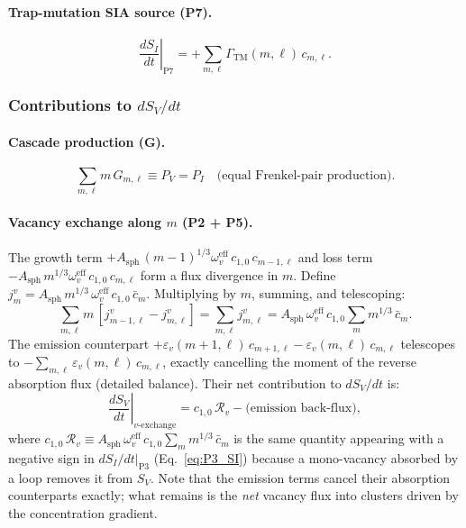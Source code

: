 \documentclass[pdflatex,sn-basic]{sn-jnl} %
\begin{document}
\paragraph{Trap-mutation SIA source (P7).}
\begin{equation}\label{eq:P7_SI}
    \left.\frac{dS_I}{dt}\right|_{\mathrm{P7}}
    = +\sum_{m,\ell}\Gamma_{\mathrm{TM}}(m,\ell)\,c_{m,\ell}.
\end{equation}

\subsubsection*{Contributions to $dS_V/dt$}

\paragraph{Cascade production (G).}
\begin{equation}
    \sum_{m,\ell} m\,G_{m,\ell} \equiv P_V = P_I
    \quad \text{(equal Frenkel-pair production)}.
\end{equation}

\paragraph{Vacancy exchange along $m$ (P2 + P5).}
The growth term $+A_{\mathrm{sph}}\,(m{-}1)^{1/3}\omega_v^{\mathrm{eff}}\,
c_{1,0}\,c_{m-1,\ell}$ and loss term $-A_{\mathrm{sph}}\,m^{1/3}
\omega_v^{\mathrm{eff}}\,c_{1,0}\,c_{m,\ell}$ form a flux divergence in $m$.
Define $j_m^v = A_{\mathrm{sph}}\,m^{1/3}\,\omega_v^{\mathrm{eff}}\,c_{1,0}
\,\bar{c}_m$. Multiplying by $m$, summing, and telescoping:
\begin{equation}\label{eq:P2v_SV}
    \sum_{m,\ell} m\,[j_{m-1,\ell}^v - j_{m,\ell}^v]
    = \sum_{m,\ell} j_{m,\ell}^v
    = A_{\mathrm{sph}}\,\omega_v^{\mathrm{eff}}\,c_{1,0}
      \sum_m m^{1/3}\,\bar{c}_m.
\end{equation}
The emission counterpart $+\varepsilon_v(m{+}1,\ell)\,c_{m+1,\ell} -
\varepsilon_v(m,\ell)\,c_{m,\ell}$ telescopes to
$-\sum_{m,\ell}\varepsilon_v(m,\ell)\,c_{m,\ell}$, exactly cancelling the
moment of the reverse absorption flux (detailed balance). Their net
contribution to $dS_V/dt$ is:
\begin{equation}\label{eq:P2P5v_SV}
    \left.\frac{dS_V}{dt}\right|_{v\text{-exchange}}
    = c_{1,0}\,\mathcal{R}_v - \text{(emission back-flux)},
\end{equation}
where $c_{1,0}\,\mathcal{R}_v \equiv A_{\mathrm{sph}}\,\omega_v^{\mathrm{eff}}
\,c_{1,0}\sum_m m^{1/3}\,\bar{c}_m$ is the same quantity appearing with a
negative sign in $dS_I/dt|_{\mathrm{P3}}$ (Eq.~\ref{eq:P3_SI}) because a
mono-vacancy absorbed by a loop removes it from $S_V$. Note that the
emission terms cancel their absorption counterparts exactly; what remains is
the \emph{net} vacancy flux into clusters driven by the concentration gradient.
\end{document}
